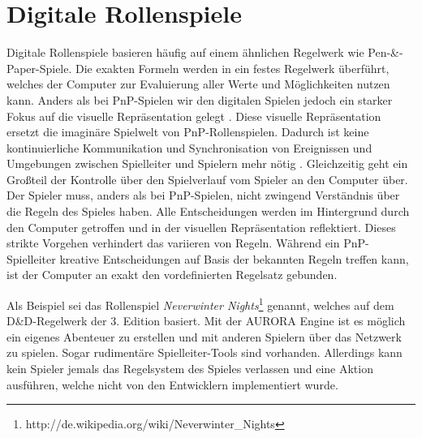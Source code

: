 \section{Digitale Rollenspiele}
\label{sec:DigitaleRollenspiele}
%

Digitale Rollenspiele basieren häufig auf einem ähnlichen Regelwerk wie Pen-\&-Paper-Spiele. Die exakten Formeln werden in ein festes Regelwerk überführt, welches der Computer zur Evaluierung aller Werte und Möglichkeiten nutzen kann. Anders als bei PnP-Spielen wir den digitalen Spielen jedoch ein starker Fokus auf die visuelle Repräsentation gelegt \cite{Tychsen2006}. Diese visuelle Repräsentation ersetzt die imaginäre Spielwelt von PnP-Rollenspielen. Dadurch ist keine kontinuierliche Kommunikation und Synchronisation von Ereignissen und Umgebungen zwischen Spielleiter und Spielern mehr nötig \cite{Drachen2008}.\newline
Gleichzeitig geht ein Großteil der Kontrolle über den Spielverlauf vom Spieler an den Computer über. Der Spieler muss, anders als bei PnP-Spielen, nicht zwingend Verständnis über die Regeln des Spieles haben. Alle Entscheidungen werden im Hintergrund durch den Computer getroffen und in der visuellen Repräsentation reflektiert. Dieses strikte Vorgehen verhindert das variieren von Regeln. Während ein PnP-Spielleiter kreative Entscheidungen auf Basis der bekannten Regeln treffen kann, ist der Computer an exakt den vordefinierten Regelsatz gebunden. \cite{Drachen2008}

Als Beispiel sei das Rollenspiel \emph{Neverwinter Nights}\footnote{http://de.wikipedia.org/wiki/Neverwinter\_Nights} genannt, welches auf dem D\&D-Regelwerk der 3. Edition basiert. Mit der AURORA Engine ist es möglich ein eigenes Abenteuer zu erstellen und mit anderen Spielern über das Netzwerk zu spielen. Sogar rudimentäre Spielleiter-Tools sind vorhanden. Allerdings kann kein Spieler jemals das Regelsystem des Spieles verlassen und eine Aktion ausführen, welche nicht von den Entwicklern implementiert wurde.\cite{Tychsen2006a}



